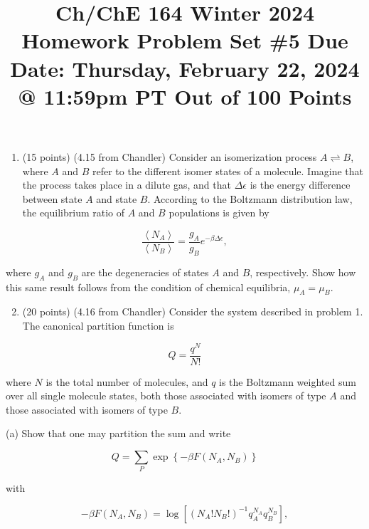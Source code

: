 \documentclass[12pt]{article}
\title{Ch/ChE 164 Winter 2024 
 Homework Problem Set \#5 
 Due Date: Thursday, February 22, 2024 @ 11:59pm PT 
 Out of 100 Points }
\author{}
\date{}
\begin{document}
\maketitle
\begin{enumerate}
  \item (15 points) (4.15 from Chandler) Consider an isomerization process $A \rightleftharpoons B$, where $A$ and $B$ refer to the different isomer states of a molecule. Imagine that the process takes place in a dilute gas, and that $\Delta \epsilon$ is the energy difference between state $A$ and state $B$. According to the Boltzmann distribution law, the equilibrium ratio of $A$ and $B$ populations is given by
\end{enumerate}


\begin{equation*}
\frac{\left\langle N_{A}\right\rangle}{\left\langle N_{B}\right\rangle}=\frac{g_{A}}{g_{B}} e^{-\beta \Delta \epsilon}, \tag{1}
\end{equation*}


where $g_{A}$ and $g_{B}$ are the degeneracies of states $A$ and $B$, respectively. Show how this same result follows from the condition of chemical equilibria, $\mu_{A}=\mu_{B}$.

\begin{enumerate}
  \setcounter{enumi}{1}
  \item (20 points) (4.16 from Chandler) Consider the system described in problem 1. The canonical partition function is
\end{enumerate}


\begin{equation*}
Q=\frac{q^{N}}{N !} \tag{2}
\end{equation*}


where $N$ is the total number of molecules, and $q$ is the Boltzmann weighted sum over all single molecule states, both those associated with isomers of type $A$ and those associated with isomers of type $B$.

(a) Show that one may partition the sum and write


\begin{equation*}
Q=\sum_{P} \exp \left\{-\beta F\left(N_{A}, N_{B}\right)\right\} \tag{3}
\end{equation*}


with


\begin{equation*}
-\beta F\left(N_{A}, N_{B}\right)=\log \left[\left(N_{A} ! N_{B} !\right)^{-1} q_{A}^{N_{A}} q_{B}^{N_{B}}\right], \tag{4}
\end{equation*}
\end{document}
